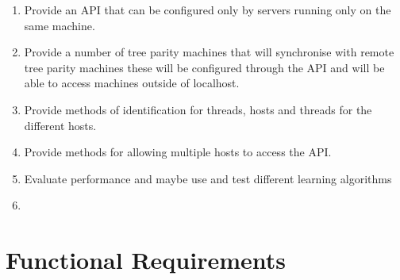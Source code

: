 \begin{enumerate}

	\item Provide an API that can be configured only by servers running only on the same machine.
	\item Provide a number of tree parity machines that will synchronise with remote tree parity machines these will be configured through the API and will be able to access machines outside of localhost.
	\item Provide methods of identification for threads, hosts and threads for the different hosts.
	\item Provide methods for allowing multiple hosts to access the API.
	\item Evaluate performance and maybe use and test different learning algorithms
	\item 
	
	
	
	

\end{enumerate}

\section{Functional Requirements}




